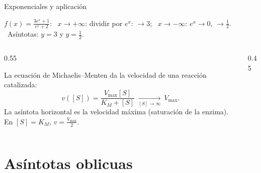 \documentclass[10pt,aspectratio=169]{beamer}
\begin{document}
\begin{frame}{Exponenciales y aplicación}
  \begin{ejemplo}[6]
    $\displaystyle f(x)=\frac{3e^x+1}{e^x+2}$: \ $x\to+\infty$: dividir por $e^x$: $\to3$; \ $x\to-\infty$: $e^x\to0$, $\to\frac12$.
    \ Asíntotas: $y=3$ y $y=\frac12$.
  \end{ejemplo}
  \begin{columns}
    \begin{column}{0.55\textwidth}
      \begin{ejemplo}
        La ecuación de Michaelis--Menten da la velocidad de una reacción catalizada:
        \[ v([S])=\frac{V_{\max}[S]}{K_M+[S]}\ \xrightarrow[{[S]}\to\infty]{}\ V_{\max}. \]
        La asíntota horizontal es la velocidad máxima (saturación de la enzima). En $[S]=K_M$, $v=\frac{V_{\max}}2$.
      \end{ejemplo}
    \end{column}
    \begin{column}{0.45\textwidth}
      \centering
    \end{column}
  \end{columns}
\end{frame}

\section{Asíntotas oblicuas}
\end{document}
